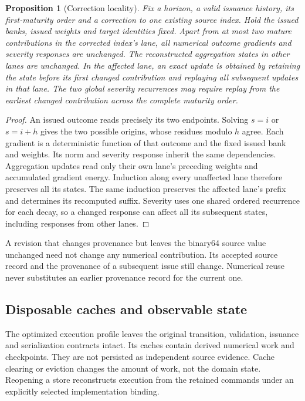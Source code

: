 \documentclass[11pt,a4paper]{article}
\newtheorem{proposition}[theorem]{Proposition}
\theoremstyle{definition}\newtheorem{definition}[theorem]{Definition}
\begin{document}
\begin{proposition}[Correction locality]\label{prop:incrementallocality}
Fix a horizon, a valid issuance history, its first-maturity order and a correction to one existing source index. Hold the issued banks, issued weights and target identities fixed. Apart from at most two mature contributions in the corrected index's lane, all numerical outcome gradients and severity responses are unchanged. The reconstructed aggregation states in other lanes are unchanged. In the affected lane, an exact update is obtained by retaining the state before its first changed contribution and replaying all subsequent updates in that lane. The two global severity recurrences may require replay from the earliest changed contribution across the complete maturity order.
\end{proposition}
\begin{proof}
An issued outcome reads precisely its two endpoints. Solving $s=i$ or $s=i+h$ gives the two possible origins, whose residues modulo $h$ agree. Each gradient is a deterministic function of that outcome and the fixed issued bank and weights. Its norm and severity response inherit the same dependencies. Aggregation updates read only their own lane's preceding weights and accumulated gradient energy. Induction along every unaffected lane therefore preserves all its states. The same induction preserves the affected lane's prefix and determines its recomputed suffix. Severity uses one shared ordered recurrence for each decay, so a changed response can affect all its subsequent states, including responses from other lanes.
\end{proof}
A revision that changes provenance but leaves the binary64 source value unchanged need not change any numerical contribution. Its accepted source record and the provenance of a subsequent issue still change. Numerical reuse never substitutes an earlier provenance record for the current one.

\subsection{Disposable caches and observable state}
The optimized execution profile leaves the original transition, validation, issuance and serialization contracts intact. Its caches contain derived numerical work and checkpoints. They are not persisted as independent source evidence. Cache clearing or eviction changes the amount of work, not the domain state. Reopening a store reconstructs execution from the retained commands under an explicitly selected implementation binding.
\end{document}
